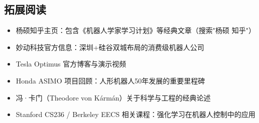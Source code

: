 \subsection{拓展阅读}

\begin{itemize}
    \item 杨硕知乎主页：包含《机器人学家学习计划》等经典文章（搜索"杨硕 知乎"）
    \item 妙动科技官方信息：深圳+硅谷双城布局的消费级机器人公司
    \item Tesla Optimus 官方博客与演示视频
    \item Honda ASIMO 项目回顾：人形机器人50年发展的重要里程碑
    \item 冯·卡门（Theodore von K\'arm\'an）关于科学与工程的经典论述
    \item Stanford CS236 / Berkeley EECS 相关课程：强化学习在机器人控制中的应用
\end{itemize}



